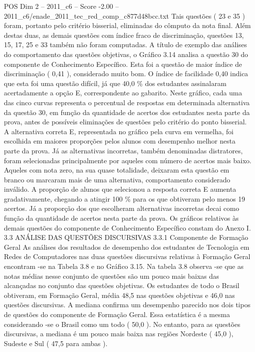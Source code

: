 \begin{textsample}{POS Dim 2 – 2011\_c6 – Score -2.00 – 2011\_c6/enade\_2011\_tec\_red\_comp\_c877d48bcc.txt}
Tais questões ( 23 e 35 ) foram, portanto pelo critério bisserial, eliminadas do cômputo da nota final.
Além destas duas, as demais questões com índice fraco de discriminação, questões 13, 15, 17, 25 e 33 também não foram computadas.
A título de exemplo das análises do comportamento das questões objetivas, o Gráfico 3.14 analisa a questão 30 do componente de Conhecimento Específico.
Esta foi a questão de maior índice de discriminação ( 0,41 ), considerado muito bom.
O índice de facilidade 0,40 indica que esta foi uma questão difícil, já que 40,0 \% dos estudantes assinalaram acertadamente a opção E, correspondente ao gabarito.
Neste gráfico, cada uma das cinco curvas representa o percentual de respostas em determinada alternativa da questão 30, em função da quantidade de acertos dos estudantes nesta parte da prova, antes de possíveis eliminações de questões pelo critério do ponto bisserial.
A alternativa correta E, representada no gráfico pela curva em vermelha, foi escolhida em maiores proporções pelos alunos com desempenho melhor nesta parte da prova.
Já as alternativas incorretas, também denominadas distratores, foram selecionadas principalmente por aqueles com número de acertos mais baixo.
Aqueles com nota zero, na sua quase totalidade, deixaram esta questão em branco ou marcaram mais de uma alternativa, comportamento considerado inválido.
A proporção de alunos que selecionou a resposta correta E aumenta gradativamente, chegando a atingir 100 \% para os que obtiveram pelo menos 19 acertos.
Já a proporção dos que escolheram alternativas incorretas decai como função da quantidade de acertos nesta parte da prova.
Os gráficos relativos às demais questões do componente de Conhecimento Específico constam do Anexo I. 3.3 ANÁLISE DAS QUESTÕES DISCURSIVAS 3.3.1 Componente de Formação Geral As análises dos resultados de desempenho dos estudantes de Tecnologia em Redes de Computadores nas duas questões discursivas relativas à Formação Geral encontram -se na Tabela 3.8 e no Gráfico 3.15.
Na tabela 3.8 observa -se que as notas médias nesse conjunto de questões são um pouco mais baixas das alcançadas no conjunto das questões objetivas.
Os estudantes de todo o Brasil obtiveram, em Formação Geral, média 48,5 nas questões objetivas e 46,0 nas questões discursivas.
A mediana confirma um desempenho parecido nos dois tipos de questões do componente de Formação Geral.
Essa estatística é a mesma considerando -se o Brasil como um todo ( 50,0 ).
No entanto, para as questões discursivas, a mediana é um pouco mais baixa nas regiões Nordeste ( 45,0 ), Sudeste e Sul ( 47,5 para ambas ).

\end{textsample}
